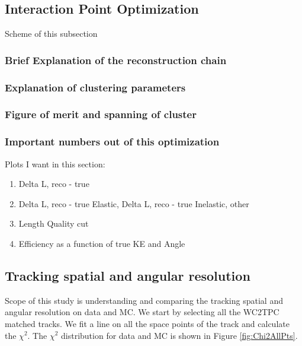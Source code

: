 \subsection{Interaction Point Optimization}\label{ch:TrackingOptimization}
Scheme of this subsection
\subsubsection{Brief Explanation of the reconstruction chain}
\subsubsection{Explanation of clustering parameters}
\subsubsection{Figure of merit and  spanning of cluster}
\subsubsection{Important numbers out of this optimization}


Plots I want in this section:
\begin{enumerate}
\item Delta L, reco - true
\item Delta L, reco - true Elastic, Delta L, reco - true Inelastic, other
\item Length Quality cut
\item Efficiency as a function of true KE and Angle
\end{enumerate}


\subsection{Tracking spatial and angular resolution}
Scope of this study is understanding and comparing the tracking spatial and angular resolution on data and MC.
We start by selecting all the WC2TPC matched tracks. 
We fit a line on all the space points of the track and calculate the $\chi^2$. The $\chi^2$ distribution for data and MC is shown in Figure \ref{fig:Chi2AllPts}.

